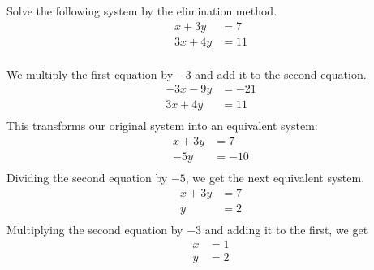 \begin{example}
    Solve the following system by the elimination method.
    \[
        \begin{aligned}
            x + 3y  & = 7  \\
            3x + 4y & = 11 \\
        \end{aligned}
    \]
\end{example}
\begin{solution}
    We multiply the first equation by $-3$ and add it to the second equation.
    \[
        \begin{aligned}
            -3x - 9y & = -21 \\
            3x + 4y  & = 11  \\
        \end{aligned}
    \]
    This transforms our original system into an equivalent system:
    \[
        \begin{aligned}
            x + 3y & = 7   \\
            -5y    & = -10 \\
        \end{aligned}
    \]
    Dividing the second equation by $-5$, we get the next equivalent system.
    \[
        \begin{aligned}
            x + 3y & = 7 \\
            y      & = 2 \\
        \end{aligned}
    \]
    Multiplying the second equation by $-3$ and adding it to the first, we get
    \[
        \begin{aligned}
            x & = 1 \\
            y & = 2 \\
        \end{aligned}
    \]
\end{solution}

